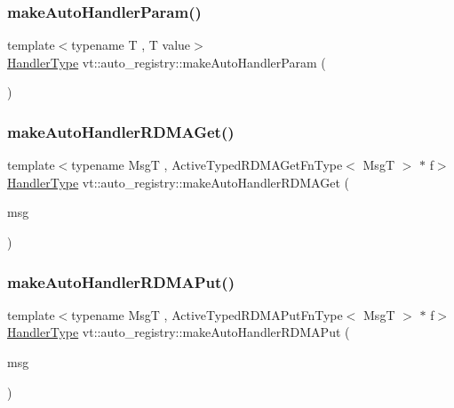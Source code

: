 \subsubsection{\texorpdfstring{make\+Auto\+Handler\+Param()}{makeAutoHandlerParam()}}
{\footnotesize\ttfamily template$<$typename T , T value$>$ \\
\hyperlink{namespacevt_af64846b57dfcaf104da3ef6967917573}{Handler\+Type} vt\+::auto\+\_\+registry\+::make\+Auto\+Handler\+Param (\begin{DoxyParamCaption}{ }\end{DoxyParamCaption})\hspace{0.3cm}{\ttfamily [inline]}}

\mbox{\label{namespacevt_1_1auto__registry_a39843aa07e65ad269c6d5992fb00a78b}} 
\subsubsection{\texorpdfstring{make\+Auto\+Handler\+R\+D\+M\+A\+Get()}{makeAutoHandlerRDMAGet()}}
{\footnotesize\ttfamily template$<$typename MsgT , Active\+Typed\+R\+D\+M\+A\+Get\+Fn\+Type$<$ Msg\+T $>$ $\ast$ f$>$ \\
\hyperlink{namespacevt_af64846b57dfcaf104da3ef6967917573}{Handler\+Type} vt\+::auto\+\_\+registry\+::make\+Auto\+Handler\+R\+D\+M\+A\+Get (\begin{DoxyParamCaption}\item[{MsgT $\ast$const}]{msg }\end{DoxyParamCaption})\hspace{0.3cm}{\ttfamily [inline]}}

\mbox{\label{namespacevt_1_1auto__registry_a503593dc49a12ea9e87e92ff10493bbe}} 
\subsubsection{\texorpdfstring{make\+Auto\+Handler\+R\+D\+M\+A\+Put()}{makeAutoHandlerRDMAPut()}}
{\footnotesize\ttfamily template$<$typename MsgT , Active\+Typed\+R\+D\+M\+A\+Put\+Fn\+Type$<$ Msg\+T $>$ $\ast$ f$>$ \\
\hyperlink{namespacevt_af64846b57dfcaf104da3ef6967917573}{Handler\+Type} vt\+::auto\+\_\+registry\+::make\+Auto\+Handler\+R\+D\+M\+A\+Put (\begin{DoxyParamCaption}\item[{MsgT $\ast$const}]{msg }\end{DoxyParamCaption})\hspace{0.3cm}{\ttfamily [inline]}}

